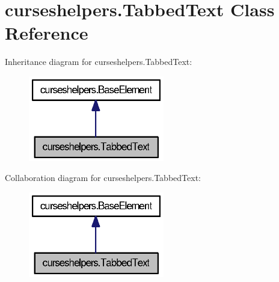 \section{curseshelpers.\-Tabbed\-Text Class Reference}
\label{classcurseshelpers_1_1TabbedText}


Inheritance diagram for curseshelpers.\-Tabbed\-Text\-:
\nopagebreak
\begin{figure}[H]
\begin{center}
\leavevmode
\includegraphics[width=168pt]{classcurseshelpers_1_1TabbedText__inherit__graph}
\end{center}
\end{figure}


Collaboration diagram for curseshelpers.\-Tabbed\-Text\-:
\nopagebreak
\begin{figure}[H]
\begin{center}
\leavevmode
\includegraphics[width=168pt]{classcurseshelpers_1_1TabbedText__coll__graph}
\end{center}
\end{figure}
